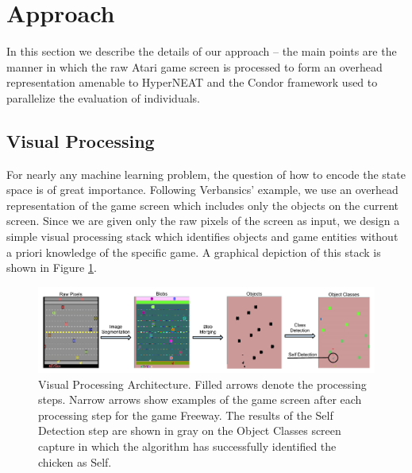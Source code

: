 \documentclass{acm_proc_article-sp}
\begin{document}
\section{Approach}
\label{sec:approach}
In this section we describe the details of our approach -- the main points are the manner in which the raw Atari game screen is processed to form an overhead representation amenable to HyperNEAT and the Condor framework used to parallelize the evaluation of individuals.

\subsection{Visual Processing}

For nearly any machine learning problem, the question of how to encode the state space is of great importance. Following Verbansics' example, we use an overhead representation of the game screen which includes only the objects on the current screen. Since we are given only the raw pixels of the screen as input, we design a simple visual processing stack which identifies objects and game entities without a priori knowledge of the specific game. A graphical depiction of this stack is shown in Figure \ref{fig:visproc}.

\begin{figure}[htp]
\begin{center}
\includegraphics[width=\textwidth]{figures/AtariArch}
\end{center}
\caption{Visual Processing Architecture. Filled arrows denote the processing steps. Narrow arrows show examples of the game screen after each processing step for the game Freeway. The results of the Self Detection step are shown in gray on the Object Classes screen capture in which the algorithm has successfully identified the chicken as Self.}
\label{fig:visproc}
\end{figure}
\end{document}

